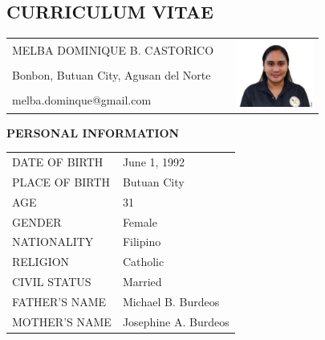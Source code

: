 \documentclass[12pt]{report}
\newcommand{\authora}{
    Melba Dominique B. Castorico %
}
\begin{document}
\printbibliography[
    title = {REFERENCES},
    heading = bibintoc
]

\setlength{\parindent}{0mm}

\begin{spacing}{1.55}

\chapter*{CURRICULUM VITAE}

\begin{tabularx}{\linewidth}{@{}lXr}
    \MakeUppercase{\authora} && \multirow{3}{*}{\includegraphics[width=1in]{img/burdeos}} \\ %
    Bonbon, Butuan City, Agusan del Norte && \\
    melba.dominque@gmail.com && \\
\end{tabularx}

\vspace{20pt}

\textbf{PERSONAL INFORMATION}

\vspace{-10pt}
\hrulefill

\begin{tabular}{@{}l@{ : }l}
    DATE OF BIRTH & June 1, 1992 \\
    PLACE OF BIRTH & Butuan City \\
    AGE & 31 \\
    GENDER & Female \\
    NATIONALITY & Filipino \\
    RELIGION & Catholic \\
    CIVIL STATUS & Married \\
    FATHER'S NAME & Michael B. Burdeos \\
    MOTHER'S NAME & Josephine A. Burdeos \\
\end{tabular}


\end{spacing}
\end{document}
